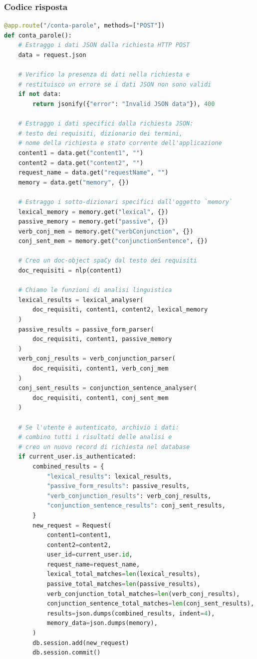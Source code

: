 \documentclass[12pt]{report}
\begin{document}
\subsubsection{Codice risposta}
\begin{lstlisting}[language=Python]
@app.route("/conta-parole", methods=["POST"])
def conta_parole():
    # Estraggo i dati JSON dalla richiesta HTTP POST
    data = request.json

    # Verifico la presenza di dati nella richiesta e
    # restituisco un errore se i dati JSON non sono validi
    if not data:
        return jsonify({"error": "Invalid JSON data"}), 400

    # Estraggo i dati specifici dalla richiesta JSON:
    # testo dei requisiti, dizionario dei termini,
    # nome della richiesta e stato corrente dell'applicazione
    content1 = data.get("content1", "")
    content2 = data.get("content2", "")
    request_name = data.get("requestName", "")
    memory = data.get("memory", {})

    # Estraggo i sotto-dizionari specifici dall'oggetto `memory`
    lexical_memory = memory.get("lexical", {})
    passive_memory = memory.get("passive", {})
    verb_conj_mem = memory.get("verbConjunction", {})
    conj_sent_mem = memory.get("conjunctionSentence", {})

    # Creo un doc-object spaCy dal testo dei requisiti
    doc_requisiti = nlp(content1)

    # Chiamo le funzioni di analisi linguistica
    lexical_results = lexical_analyser(
        doc_requisiti, content1, content2, lexical_memory
    )
    passive_results = passive_form_parser(
        doc_requisiti, content1, passive_memory
    )
    verb_conj_results = verb_conjunction_parser(
        doc_requisiti, content1, verb_conj_mem
    )
    conj_sent_results = conjunction_sentence_analyser(
        doc_requisiti, content1, conj_sent_mem
    )

    # Se l'utente è autenticato, archivio i dati:
    # combino tutti i risultati delle analisi e
    # creo un nuovo record di richiesta nel database
    if current_user.is_authenticated:
        combined_results = {
            "lexical_results": lexical_results,
            "passive_form_results": passive_results,
            "verb_conjunction_results": verb_conj_results,
            "conjunction_sentence_results": conj_sent_results,
        }
        new_request = Request(
            content1=content1,
            content2=content2,
            user_id=current_user.id,
            request_name=request_name,
            lexical_total_matches=len(lexical_results),
            passive_total_matches=len(passive_results),
            verb_conjunction_total_matches=len(verb_conj_results),
            conjunction_sentence_total_matches=len(conj_sent_results),
            results=json.dumps(combined_results, indent=4),
            memory_data=json.dumps(memory),
        )
        db.session.add(new_request)
        db.session.commit()


\end{lstlisting}
\end{document}
